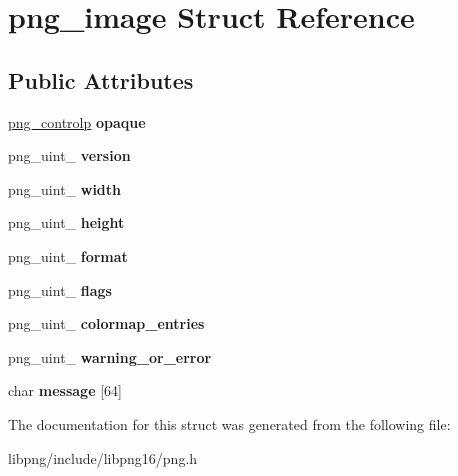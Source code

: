 \hypertarget{structpng__image}{\section{png\-\_\-image Struct Reference}
\label{structpng__image}
}
\subsection*{Public Attributes}
\begin{DoxyCompactItemize}
\item 
\hypertarget{structpng__image_a7b502596648744e2ee0c8788e2c6e918}{\hyperlink{structpng__control}{png\-\_\-controlp} {\bfseries opaque}}\label{structpng__image_a7b502596648744e2ee0c8788e2c6e918}

\item 
\hypertarget{structpng__image_a8c276ba2922051ff0ff9175ab1e23ed1}{png\-\_\-uint\-\_ {\bfseries version}}\label{structpng__image_a8c276ba2922051ff0ff9175ab1e23ed1}

\item 
\hypertarget{structpng__image_a72ec07853c82c632c2d7b3c68c62b659}{png\-\_\-uint\-\_ {\bfseries width}}\label{structpng__image_a72ec07853c82c632c2d7b3c68c62b659}

\item 
\hypertarget{structpng__image_aaf3cb3eb97ee0938a5e870a96fd1fa48}{png\-\_\-uint\-\_ {\bfseries height}}\label{structpng__image_aaf3cb3eb97ee0938a5e870a96fd1fa48}

\item 
\hypertarget{structpng__image_a8a7469310ce4682932b0bc94624f35d1}{png\-\_\-uint\-\_ {\bfseries format}}\label{structpng__image_a8a7469310ce4682932b0bc94624f35d1}

\item 
\hypertarget{structpng__image_ab9519ecd9acf79b507dad566cc3b379f}{png\-\_\-uint\-\_ {\bfseries flags}}\label{structpng__image_ab9519ecd9acf79b507dad566cc3b379f}

\item 
\hypertarget{structpng__image_a48bf1c6518f03da900f41cd9aa5ae5b7}{png\-\_\-uint\-\_ {\bfseries colormap\-\_\-entries}}\label{structpng__image_a48bf1c6518f03da900f41cd9aa5ae5b7}

\item 
\hypertarget{structpng__image_a1b6e296964e81414b0a1cf232ffbcfce}{png\-\_\-uint\-\_ {\bfseries warning\-\_\-or\-\_\-error}}\label{structpng__image_a1b6e296964e81414b0a1cf232ffbcfce}

\item 
\hypertarget{structpng__image_a79795885d73dff1a4aec1cbbb8a4c36f}{char {\bfseries message} \mbox{[}64\mbox{]}}\label{structpng__image_a79795885d73dff1a4aec1cbbb8a4c36f}

\end{DoxyCompactItemize}


The documentation for this struct was generated from the following file\-:\begin{DoxyCompactItemize}
\item 
libpng/include/libpng16/png.\-h\end{DoxyCompactItemize}

